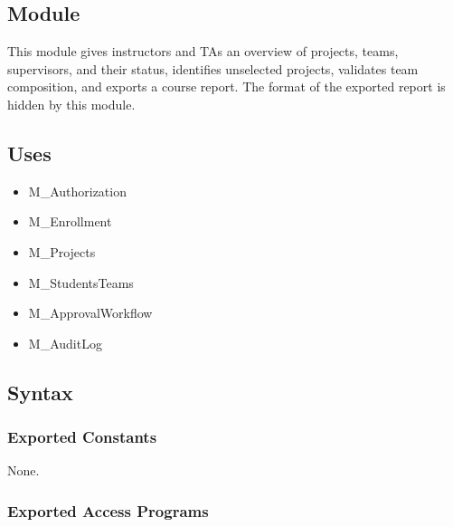 \documentclass[12pt, titlepage]{article}
\begin{document}
\subsection{Module}

This module gives instructors and TAs an overview of projects, teams, supervisors, and their status,
identifies unselected projects, validates team composition, and exports a course report.
The format of the exported report is hidden by this module.

\subsection{Uses}

\begin{itemize}
    \item M\_Authorization
    \item M\_Enrollment
    \item M\_Projects
    \item M\_StudentsTeams
    \item M\_ApprovalWorkflow
    \item M\_AuditLog
\end{itemize}

\subsection{Syntax}

\subsubsection{Exported Constants}
None.

\subsubsection{Exported Access Programs}
\end{document}
